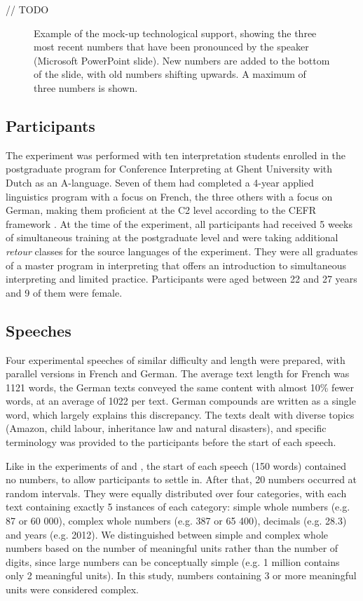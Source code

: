 \documentclass[output=paper]{langsci/langscibook}
\begin{document}
// TODO
\begin{figure}
\caption{Example of the mock-up technological support, showing the three most recent numbers that have been pronounced by the speaker (Microsoft PowerPoint slide). New numbers are added to the bottom of the slide, with old numbers shifting upwards. A maximum of three numbers is shown.\label{fig:01:1}}
\end{figure}

\subsection{Participants}

The experiment was performed with ten interpretation students enrolled in the postgraduate program for Conference Interpreting at Ghent University with Dutch as an A-language. Seven of them had completed a 4-year applied linguistics program with a focus on French, the three others with a focus on German, making them proficient at the C2 level according to the \textsc{CEFR} framework \citep{Council2001}. At the time of the experiment, all participants had received 5 weeks of simultaneous training at the postgraduate level and were taking additional \textit{retour} classes for the source languages of the experiment. They were all graduates of a master program in interpreting that offers an introduction to simultaneous interpreting and limited practice. Participants were aged between 22 and 27 years and 9 of them were female. 

\subsection{Speeches}

Four experimental speeches of similar difficulty and length were prepared, with parallel versions in French and German. The average text length for French was 1121 words, the German texts conveyed the same content with almost 10\% fewer words, at an average of 1022 per text. German compounds are written as a single word, which largely explains this discrepancy. The texts dealt with diverse topics (Amazon, child labour, inheritance law and natural disasters), and specific terminology was provided to the participants before the start of each speech.

Like in the experiments of \citet{Braun1996} and \citet{Mazza2001}, the start of each speech (150 words) contained no numbers, to allow participants to settle in. After that, 20 numbers occurred at random intervals. They were equally distributed over four categories, with each text containing exactly 5 instances of each category: simple whole numbers (e.g. 87 or 60 000), complex whole numbers (e.g. 387 or 65 400), decimals (e.g. 28.3) and years (e.g. 2012). We distinguished between simple and complex whole numbers based on the number of meaningful units rather than the number of digits, since large numbers can be conceptually simple (e.g. 1 million contains only 2 meaningful units). In this study, numbers containing 3 or more meaningful units were considered complex.
\end{document}
